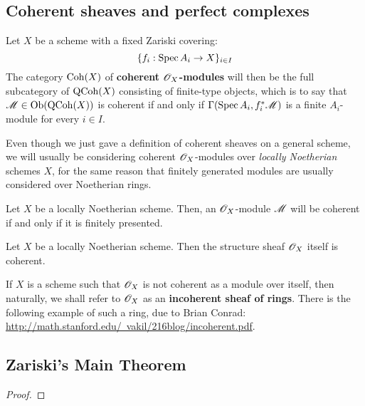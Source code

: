         \subsection{Coherent sheaves and perfect complexes}
            \begin{definition} \label{def: coherent_modules}
                Let $X$ be a scheme with a fixed Zariski covering:
                    $$\{ f_i: \operatorname{Spec} A_i \to X \}_{i \in I}$$
                The category $\mathrm{Coh}(X)$ of \textbf{coherent $\mathscr{O}_X$-modules} will then be the full subcategory of $\mathrm{QCoh}(X)$ consisting of finite-type objects, which is to say that $\mathscr{M} \in \mathrm{Ob}( \mathrm{QCoh}(X) )$ is coherent if and only if $\Gamma(\operatorname{Spec} A_i, f_i^*\mathscr{M})$ is a finite $A_i$-module for every $i \in I$.
            \end{definition}
            Even though we just gave a definition of coherent sheaves on a general scheme, we will usually be considering coherent $\mathscr{O}_X$-modules over \textit{locally Noetherian} schemes $X$, for the same reason that finitely generated modules are usually considered over Noetherian rings. 
            \begin{proposition} \label{prop: coherent_modules_over_noetherian_schemes}
                Let $X$ be a locally Noetherian scheme. Then, an $\mathscr{O}_X$-module $\mathscr{M}$ will be coherent if and only if it is finitely presented.
            \end{proposition}
            \begin{example}
                Let $X$ be a locally Noetherian scheme. Then the structure sheaf $\mathscr{O}_X$ itself is coherent. 
            \end{example}
            \begin{example}
                If $X$ is a scheme such that $\mathscr{O}_X$ is not coherent as a module over itself, then naturally, we shall refer to $\mathscr{O}_X$ as an \textbf{incoherent sheaf of rings}. There is the following example of such a ring, due to Brian Conrad: \href{http://math.stanford.edu/~vakil/216blog/incoherent.pdf}{http://math.stanford.edu/~vakil/216blog/incoherent.pdf}.
            \end{example}

        \subsection{Zariski's Main Theorem}
            \begin{theorem} \label{theorem: formal_function_theorem}

            \end{theorem}
                \begin{proof}
                    
                \end{proof}

